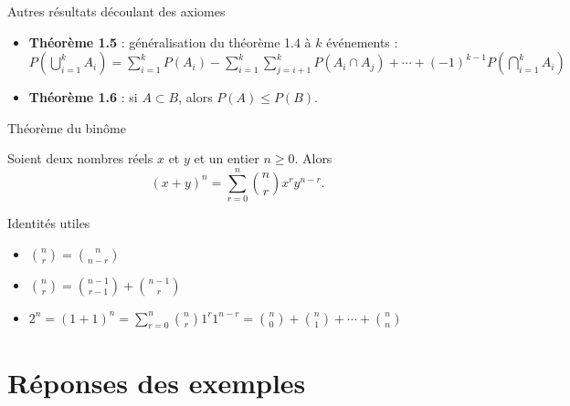 \documentclass{BeamerTemplate}
\begin{document}
\begin{frame}[t]{Autres résultats découlant des axiomes}
 \begin{itemize}\itemsep6mm
  \item<1->{\bf Théorème 1.5} : généralisation du théorème 1.4 à $k$ événements :
     \\
$P\left(\bigcup\limits_{i=1}^kA_i\right)=\sum\limits_{i=1}^kP(A_i)
  -\sum\limits_{i=1}^k\sum\limits_{j=i+1}^kP(A_i\cap A_j)+\cdots+(-1)^{k-1}P\left(\bigcap\limits_{i=1}^kA_i\right)$

  \item<2->{\bf Théorème 1.6} : si $A\subset B$, alors $P(A)\le P(B)$.

  {\small \color{gray}{[$B=(\overline{A}\cap B)\cup A$, où $\overline{A}\cap B$ et $A$ sont mutuellement exclusifs...]}}
 \end{itemize}
\end{frame}

\begin{frame}{Théorème du binôme}

 \begin{thm}{}
  Soient deux nombres réels $x$ et $y$ et un entier $n\ge0$. Alors
  $$(x+y)^n=\sum_{r=0}^n{n\choose r}x^ry^{n-r}.$$
 \end{thm}

\end{frame}

\begin{frame}[t]{Identités utiles}
\vspace{0.5 in}
 \begin{itemize} \itemsep1cm
  \item ${n\choose r}={n\choose n-r}$
  \item ${n\choose r}={n-1\choose r-1}+{n-1\choose r}$
  \item $2^n=(1+1)^n=\sum_{r=0}^n {n\choose r}1^r1^{n-r}={n\choose0}+{n\choose1}
  +\cdots+{n\choose n}$
 \end{itemize}
\end{frame}



\section{Réponses des exemples}
\end{document}
